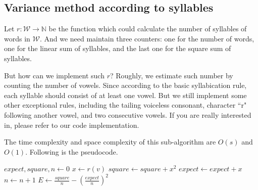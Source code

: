 \documentclass{article}
\begin{document}
        \subsection{Variance method according to syllables}
			Let $r : \mathcal{W} \rightarrow \mathbb{N}$ be the function which could calculate the number of syllables of words in $\mathcal{W}$.
			And we need maintain three counters: one for the number of words, one for the linear sum of syllables, and the last one for the
			square sum of syllables.

			But how can we implement such $r$? Roughly, we estimate such number by counting the number of vowels.
			Since according to the basic syllabication rule, each syllable should consist of at least one vowel. But we still implement some
			other exceptional rules, including the tailing voiceless consonant, character ``r" following another vowel,
			and two consecutive vowels. If you are really interested in, please refer to our code implementation.

			The time complexity and space complexity of this sub-algorithm are $O(s)$ and $O(1)$. Following is the pseudocode.

                \begin{center}
                \begin{algorithmic}
                                \State $expect, square, n \gets 0$
                                        \State $x \gets r(v)$
                                        \State $square \gets square + x^2$
                                        \State $expect \gets expect + x$
                                        \State $n \gets n + 1$
                                \EndFor
                                \State \Return $E \gets \frac{square}{n} - (\frac{expect}{n})^2$
                        \EndFunction
                \end{algorithmic}
                \end{center}
\end{document}

